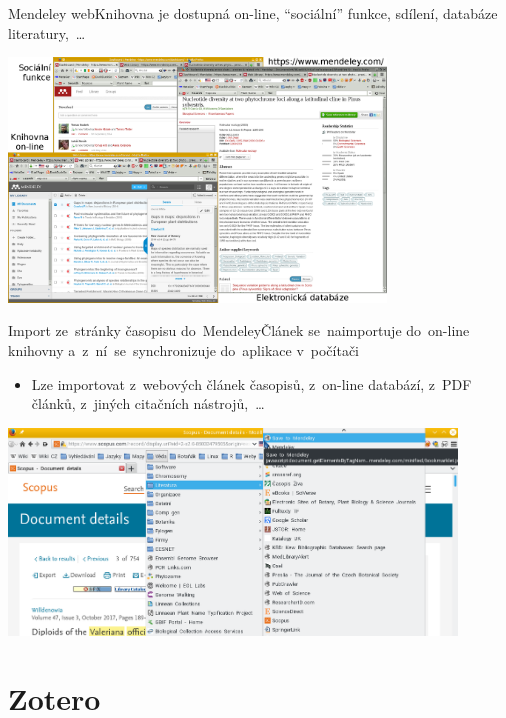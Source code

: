 \documentclass[compress, ucs, xelatex, 11pt, xcolor=svgnames, aspectratio=169,
	hyperref={
		bookmarks=true,
		unicode=true,
		colorlinks=true,
		pdftitle={Citacni software},
		plainpages=false,
		pdfauthor={Vojtech Zeisek},
		pdfsubject={Kratky uvod do citacniho software},
		pdfcreator={XeLaTeX},
		pdfkeywords={citace, reference, software, literatura},
		linkcolor=Crimson, %
		anchorcolor=Magenta, %
		citecolor=Magenta, %
		filecolor=Magenta, %
		menucolor=Magenta, %
		urlcolor=DarkTurquoise, %
		pdftex},
	url={hyphens, lowtilde} %
	]{beamer}
\begin{document}
\begin{frame}{Mendeley web}{Knihovna je dostupná on-line, \enquote{sociální} funkce, sdílení, databáze literatury,~\ldots}
        \begin{center}
                \includegraphics[height=6.5cm]{mendeley_web.png}
        \end{center}
\end{frame}

\begin{frame}{Import ze~stránky časopisu do~Mendeley}{Článek se~naimportuje do~on-line knihovny a~z~ní~se~synchronizuje do~aplikace v~počítači}
	\begin{itemize}
		\item Lze importovat z~webových článek časopisů, z~on-line databází, z~PDF článků, z~jiných citačních nástrojů,~\ldots
	\end{itemize}
	\begin{center}
		\includegraphics[height=5.5cm]{mendeley_web_import.png}
	\end{center}
\end{frame}

\section{Zotero}
\end{document}
